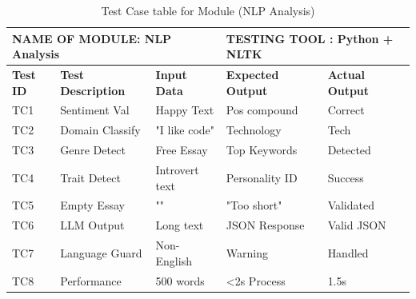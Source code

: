 \begin{table}[htbp]
\begin{center}
\caption{Test Case table for Module (NLP Analysis)}
 \begin{tabular}{| m{1cm} | m{4cm} | m{2 cm}| m{3cm}|m{3cm}| } 
\hline
\multicolumn{3}{|l|}{NAME OF MODULE: NLP Analysis}&
\multicolumn{2}{|l|}{TESTING TOOL : Python + NLTK}\\[0.8cm]
\hline
\textbf{Test ID} &\textbf{Test Description} & \textbf{Input Data} & \textbf{Expected Output} & \textbf{Actual Output} \\ 
\hline
TC1 & Sentiment Val & Happy Text & Pos compound & Correct \\[1.25cm]
\hline
TC2 & Domain Classify & "I like code" & Technology & Tech \\[1.25cm]
\hline
TC3 & Genre Detect & Free Essay & Top Keywords & Detected \\[1.25cm]
\hline
TC4 & Trait Detect & Introvert text & Personality ID & Success \\[1.25cm]
\hline
TC5 & Empty Essay & "" & "Too short" & Validated \\[1.25cm]
\hline
TC6 & LLM Output & Long text & JSON Response & Valid JSON \\[1.25cm]
\hline
TC7 & Language Guard & Non-English & Warning & Handled \\[1.25cm]
\hline
TC8 & Performance & 500 words & <2s Process & 1.5s \\[1.25cm]
\hline
\end{tabular}

\end{center}
\end{table}
\clearpage

